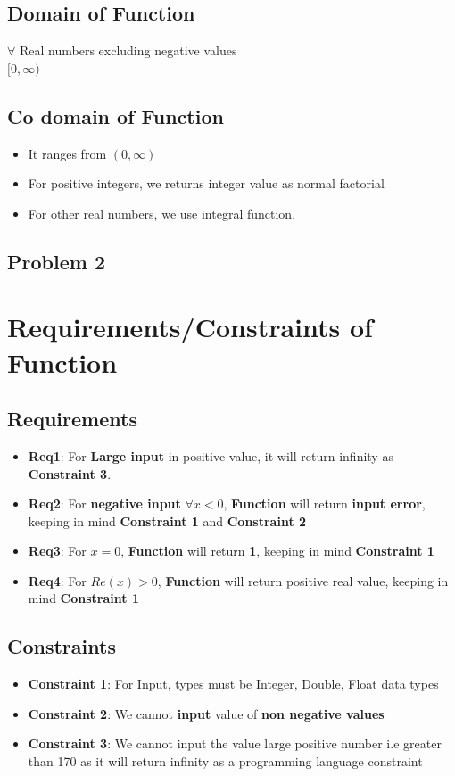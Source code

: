 \documentclass{article}
\begin{document}
\subsection{Domain of Function}
$\forall$ Real numbers excluding negative values \\
$[0, \infty)$

\subsection{Co domain of Function}
\begin{itemize}
\item It ranges from $(0, \infty)$
\item For positive integers, we returns integer value as normal factorial
\item For other real numbers, we use integral function.
\end{itemize}
\begin{center}
    \section*{Problem 2}
\end{center}
\section{Requirements/Constraints of Function}
\subsection{Requirements}
\begin{itemize}
\item \textbf{Req1}: For \textbf{Large input} in positive value, it will return infinity as \textbf{Constraint 3}.
\item \textbf{Req2}: For \textbf{negative input} $\forall x<0 $, \textbf{Function} will return \textbf{input error}, keeping in mind \textbf{Constraint 1} and \textbf{Constraint 2}
\item \textbf{Req3}: For \textbf{$x=0$}, \textbf{Function} will return \textbf{1}, keeping in mind \textbf{Constraint 1}
\item \textbf{Req4}: For \textbf{$Re(x) > 0$}, \textbf{Function} will return positive real value, keeping in mind \textbf{Constraint 1}
\end{itemize}

\subsection{Constraints}
\begin{itemize}
\item \textbf{Constraint 1}: For Input, types must be Integer, Double, Float data types
\item \textbf{Constraint 2}: We cannot \textbf{input} value of \textbf{non negative values}
\item \textbf{Constraint 3}: We cannot input the value large positive number i.e greater than 170 as it will return infinity as a programming language constraint
\end{itemize}
\end{document}
